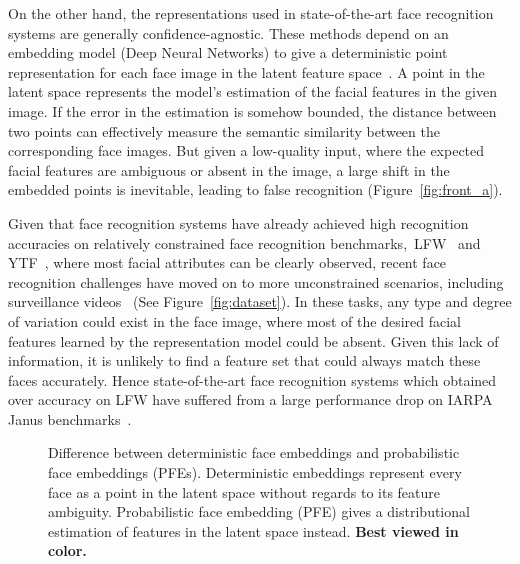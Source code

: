 \documentclass[10pt,twocolumn,letterpaper]{article}
\begin{document}
On the other hand, the representations used in state-of-the-art face recognition systems are generally confidence-agnostic. These methods depend on an embedding model (\eg Deep Neural Networks) to give a deterministic point representation for each face image in the latent feature space~\cite{schroff2015facenet,wen2016discriminative,liu2017sphereface,wang2018cosface,deng2018arcface}. A point in the latent space represents the model's estimation of the facial features in the given image. If the error in the estimation is somehow bounded, the distance between two points can effectively measure the semantic similarity between the corresponding face images. But given a low-quality input, where the expected facial features are ambiguous or absent in the image, a large shift in the embedded points is inevitable, leading to false recognition (Figure~\ref{fig:front_a}).


Given that face recognition systems have already achieved high recognition accuracies on relatively constrained face recognition benchmarks,~\eg LFW~\cite{LFWTech} and YTF~\cite{YTF}, where most facial attributes can be clearly observed, recent face recognition challenges have moved on to more unconstrained scenarios, including surveillance videos~\cite{IJBA,IJBC,IJBS} (See Figure~\ref{fig:dataset}). In these tasks, any type and degree of variation could exist in the face image, where most of the desired facial features learned by the representation model could be absent. Given this lack of information, it is unlikely to find a feature set that could always match these faces accurately. Hence state-of-the-art face recognition systems which obtained over  accuracy on LFW have suffered from a large performance drop on IARPA Janus benchmarks~\cite{IJBA,IJBC,IJBS}.













\begin{figure}[t]
    \centering
    \captionsetup{font=footnotesize}
\hfill
{}
    \caption{Difference between deterministic face embeddings and probabilistic face embeddings (PFEs). Deterministic embeddings represent every face as a point in the latent space without regards to its feature ambiguity. Probabilistic face embedding (PFE) gives a distributional estimation of features in the latent space instead. \textbf{Best viewed
in color.}}\vspace{-1.5em}
    \label{fig:frontpage}
\end{figure}
\end{document}

